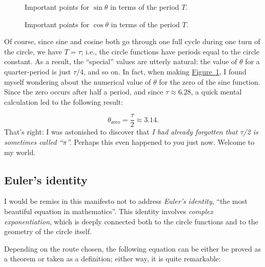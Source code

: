 \documentclass{article}
\begin{document}
\begin{figure}
\begin{center}
\end{center}
\caption{Important points for $\sin\theta$ in terms of the period $T$.\label{fig:sine_with_tau}}
\end{figure}

\begin{figure}
\begin{center}
\end{center}
\caption{Important points for $\cos\theta$ in terms of the period $T$.\label{fig:cosine_with_tau}}
\end{figure}

Of course, since sine and cosine both go through one full cycle during one turn of the circle, we have $T = \tau$; i.e., the circle functions have periods equal to the circle constant. As a result, the ``special'' values are utterly natural: the value of $\theta$ for a quarter-period is just $\tau$/4, and so on. In fact, when making \hyperref[fig:sine_with_tau]{Figure~}\ref{fig:sine_with_tau}, I found myself wondering about the numerical value of $\theta$ for the zero of the sine function. Since the zero occurs after half a period, and since $\tau \approx 6.28$, a quick mental calculation led to the following result:

\[
  \theta_\mathrm{zero} = \frac{\tau}{2} \approx 3.14.
\]
 That's right: I was astonished to discover that \emph{I had already forgotten that $\tau$/2 is sometimes called ``$\pi$''.} Perhaps this even happened to you just now. Welcome to my world.



   \subsection{Euler's identity} %
   \label{sec:euler_s_formula}

I would be remiss in this manifesto not to address \emph{Euler's identity}, ``the most beautiful equation in mathematics''. This identity involves \emph{complex exponentiation}, which is deeply connected both to the circle functions and to the geometry of the circle itself.

Depending on the route chosen, the following equation can be either be proved as a theorem or taken as a definition; either way, it is quite remarkable:
\end{document}
